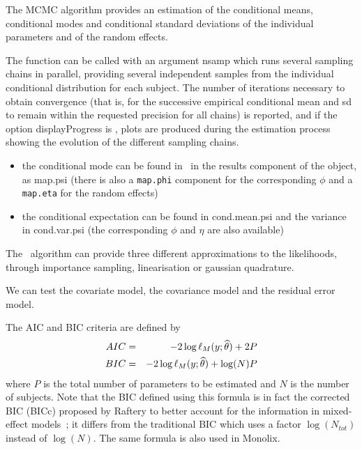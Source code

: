 The MCMC algorithm provides an estimation of the conditional means, conditional modes and conditional standard deviations of the individual parameters and of the random effects. 

The function can be called with an argument {\sf nsamp} which runs several sampling chains in parallel, providing several independent samples from the individual conditional distribution for each subject. The number of iterations necessary to obtain convergence (that is, for the successive empirical conditional mean and sd to remain within the requested precision for all chains) is reported, and if the option {\sf displayProgress} is \true, plots are produced during the estimation process showing the evolution of the different sampling chains.

\begin{itemize}
\item the conditional mode can be found in \monolix~in the results component of the object, as {\sf map.psi} (there is also a \texttt{map.phi} component for the corresponding $\phi$ and a \texttt{map.eta} for the random effects)
\item the conditional expectation can be found in {\sf cond.mean.psi} and the variance in {\sf cond.var.psi} (the corresponding $\phi$ and $\eta$ are also available)
\end{itemize}


The \monolix~algorithm can provide three different approximations to the likelihoods, through importance sampling, linearisation or gaussian quadrature. 



We can test the covariate model, the covariance model and the residual error model.

The AIC and BIC criteria are defined by
\begin{eqnarray}
AIC &=& - 2 \log \ell_M(y;{\widehat{\theta}}) + 2 P \\
BIC &=& - 2 \log \ell_M(y;{\widehat{\theta}}) + \log(N) P
\end{eqnarray}
where $P$ is the total number of parameters to be estimated and $N$ is the number of subjects. Note that the BIC defined using this formula is in fact the corrected BIC (BICc) proposed by Raftery to better account for the information in mixed-effect models~\cite{Raftery95}; it differs from the traditional BIC which uses a factor $\log(N_{tot})$ instead of $\log(N)$. The same formula is also used in {\sc Monolix}.

